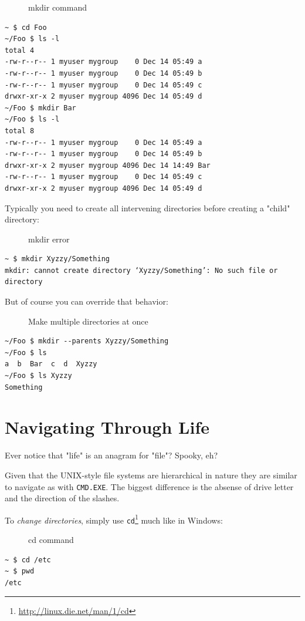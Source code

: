 \documentclass[10pt,]{book}
\renewcommand{\href}[2]{#2\footnote{\url{#1}}}
\numberwithin{figure}{chapter}
\DeclareRobustCommand{\drcap}[1]{\begin{figure}[H]\caption{#1}\end{figure}}
\DeclareRobustCommand{\drcmd}[1]{\index{Commands!#1}}
\DeclareRobustCommand{\drshl}[1]{\index{Shells!#1}}
\begin{document}
\drcap{mkdir command}

\begin{verbatim}
~ $ cd Foo
~/Foo $ ls -l
total 4
-rw-r--r-- 1 myuser mygroup    0 Dec 14 05:49 a
-rw-r--r-- 1 myuser mygroup    0 Dec 14 05:49 b
-rw-r--r-- 1 myuser mygroup    0 Dec 14 05:49 c
drwxr-xr-x 2 myuser mygroup 4096 Dec 14 05:49 d
~/Foo $ mkdir Bar
~/Foo $ ls -l
total 8
-rw-r--r-- 1 myuser mygroup    0 Dec 14 05:49 a
-rw-r--r-- 1 myuser mygroup    0 Dec 14 05:49 b
drwxr-xr-x 2 myuser mygroup 4096 Dec 14 14:49 Bar
-rw-r--r-- 1 myuser mygroup    0 Dec 14 05:49 c
drwxr-xr-x 2 myuser mygroup 4096 Dec 14 05:49 d
\end{verbatim}

Typically you need to create all intervening directories before creating
a "child" directory:

\drcap{mkdir error}

\begin{verbatim}
~ $ mkdir Xyzzy/Something
mkdir: cannot create directory ‘Xyzzy/Something’: No such file or directory
\end{verbatim}

But of course you can override that behavior:

\drcap{Make multiple directories at once}

\begin{verbatim}
~/Foo $ mkdir --parents Xyzzy/Something
~/Foo $ ls 
a  b  Bar  c  d  Xyzzy
~/Foo $ ls Xyzzy
Something
\end{verbatim}

\section*{Navigating Through Life}\label{navigating-through-life}

Ever notice that "life" is an anagram for "file"? Spooky, eh?

Given that the UNIX-style file systems are hierarchical in nature they
are similar to navigate as with \texttt{CMD.EXE}\drshl{CMD.EXE}. The
biggest difference is the absense of drive letter and the direction of
the slashes.

To \emph{change directories}, simply use
\href{http://linux.die.net/man/1/cd}{\texttt{cd}}\drcmd{cd} much like in
Windows:

\drcap{cd command}

\begin{verbatim}
~ $ cd /etc
~ $ pwd
/etc
\end{verbatim}
\end{document}

